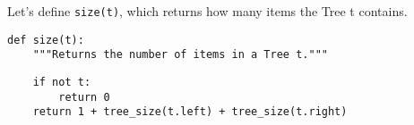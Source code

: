 \question Let's define {\tt size(t)}, which returns how many
items the Tree t contains.

\begin{lstlisting}
def size(t):
    """Returns the number of items in a Tree t."""
\end{lstlisting}
\begin{solution}[0.25in]
\begin{lstlisting}
    if not t:
        return 0
    return 1 + tree_size(t.left) + tree_size(t.right)
\end{lstlisting}
\end{solution}
